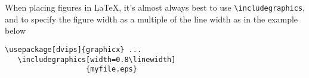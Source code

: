 \documentclass[10pt,twocolumn,letterpaper]{article}
\begin{document}
When placing figures in \LaTeX, it's almost always best to use
\verb+\includegraphics+, and to specify the  figure width as a multiple of the
line width as in the example below {\small\begin{verbatim}
\usepackage[dvips]{graphicx} ...
   \includegraphics[width=0.8\linewidth]
                   {myfile.eps}
\end{verbatim}
}


{\small


}
\end{document}
